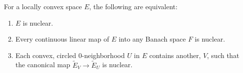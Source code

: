 For a locally convex space $E$, the following are equivalent:
\begin{enumerate}
\item[(a)] $E$ is nuclear.
\item[(b)] Every continuous linear map of $E$ into any Banach space $F$ is nuclear.
\item[(c)] Each convex, circled $0$-neighborhood $U$ in $E$ contains another, $V$, such that the canonical map $\tilde{E}_V \to \tilde{E}_U$ is nuclear.
\end{enumerate}
